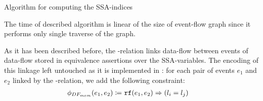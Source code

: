 \begin{algorithm}
    \caption{Algorithm for computing the SSA-indices}\label{alg:compute-ssa}
    \begin{algorithmic}[1]
                         
                        \EndIf
                    \EndFor
                \EndFor
            \EndFor
        \EndFunction
    \end{algorithmic}
    \label{algorithm:ssa-map}
\end{algorithm}

The time of described algorithm is linear of the size of event-flow graph since it performs only single traverse of the graph.

As it has been described before, the \rf-relation links data-flow between events %
of data-flow stored in equivalence assertions over the SSA-variables. 
The encoding of this linkage left untouched as it is implemented in \porthos: for each pair of events $e_1$ and $e_2$ linked by the \rf-relation, we add the following constraint:
%
\begin{align}
\phi_{DF_{mem}}(e_1, e_2) \coloneqq \ & \texttt{rf}(e_1, e_2) \Rightarrow (l_i = l_j)
\end{align}

